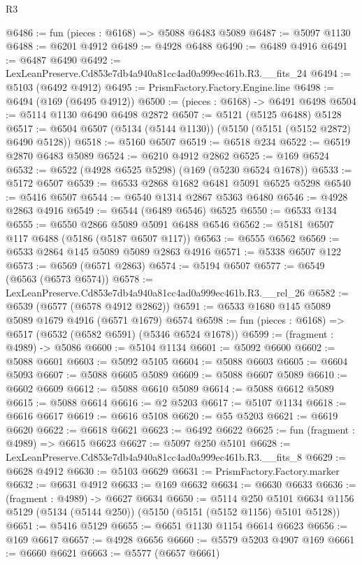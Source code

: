 \begin{lexlean}{R3}
\begin{coremodule}
@6486 := fun (pieces : @6168) => @5088 @6483 @5089
@6487 := @5097 @1130
@6488 := @6201 @4912
@6489 := @4928 @6488
@6490 := @6489 @4916
@6491 := @6487 @6490
@6492 := LexLeanPreserve.Cd853e7db4a940a81cc4ad0a999ec461b.R3.__fits_24
@6494 := @5103 (@6492 @4912)
@6495 := PrismFactory.Factory.Engine.line
@6498 := @6494 (@169 (@6495 @4912))
@6500 := (pieces : @6168) -> @6491 @6498
@6504 := @5114 @1130 @6490 @6498 @2872
@6507 := @5121 (@5125 @6488) @5128
@6517 := @6504 @6507 (@5134 (@5144 @1130)) (@5150 (@5151 (@5152 @2872) @6490 @5128))
@6518 := @5160 @6507
@6519 := @6518 @234
@6522 := @6519 @2870 @6483 @5089
@6524 := @6210 @4912 @2862
@6525 := @169 @6524
@6532 := @6522 (@4928 @6525 @5298) (@169 (@5230 @6524 @1678))
@6533 := @5172 @6507
@6539 := @6533 @2868 @1682 @6481 @5091 @6525 @5298
@6540 := @5416 @6507
@6544 := @6540 @1314 @2867 @5363 @6480
@6546 := @4928 @2863 @4916
@6549 := @6544 (@6489 @6546) @6525
@6550 := @6533 @134
@6555 := @6550 @2866 @5089 @5091 @6488 @6546
@6562 := @5181 @6507 @117 @6488 (@5186 (@5187 @6507 @117))
@6563 := @6555 @6562
@6569 := @6533 @2864 @145 @5089 @5089 @2863 @4916
@6571 := @5338 @6507 @122
@6573 := @6569 (@6571 @2863)
@6574 := @5194 @6507
@6577 := @6549 (@6563 (@6573 @6574))
@6578 := LexLeanPreserve.Cd853e7db4a940a81cc4ad0a999ec461b.R3.__rel_26
@6582 := @6539 (@6577 (@6578 @4912 @2862))
@6591 := @6533 @1680 @145 @5089 @5089 @1679 @4916 (@6571 @1679) @6574
@6598 := fun (pieces : @6168) => @6517 (@6532 (@6582 @6591) (@5346 @6524 @1678))
@6599 := (fragment : @4989) -> @5086
@6600 := @5104 @1134
@6601 := @5092 @6600
@6602 := @5088 @6601
@6603 := @5092 @5105
@6604 := @5088 @6603
@6605 := @6604 @5093
@6607 := @5088 @6605 @5089
@6609 := @5088 @6607 @5089
@6610 := @6602 @6609
@6612 := @5088 @6610 @5089
@6614 := @5088 @6612 @5089
@6615 := @5088 @6614
@6616 := @2 @5203
@6617 := @5107 @1134
@6618 := @6616 @6617
@6619 := @6616 @5108
@6620 := @55 @5203
@6621 := @6619 @6620
@6622 := @6618 @6621
@6623 := @6492 @6622
@6625 := fun (fragment : @4989) => @6615 @6623
@6627 := @5097 @250 @5101
@6628 := LexLeanPreserve.Cd853e7db4a940a81cc4ad0a999ec461b.R3.__fits_8
@6629 := @6628 @4912
@6630 := @5103 @6629
@6631 := PrismFactory.Factory.marker
@6632 := @6631 @4912
@6633 := @169 @6632
@6634 := @6630 @6633
@6636 := (fragment : @4989) -> @6627 @6634
@6650 := @5114
    @250
    @5101
    @6634
    @1156
    @5129
    (@5134 (@5144 @250))
    (@5150 (@5151 (@5152 @1156) @5101 @5128))
@6651 := @5416 @5129
@6655 := @6651 @1130 @1154 @6614 @6623
@6656 := @169 @6617
@6657 := @4928 @6656
@6660 := @5579 @5203 @4907 @169
@6661 := @6660 @6621
@6663 := @5577 (@6657 @6661)

\end{coremodule}
\end{lexlean}
